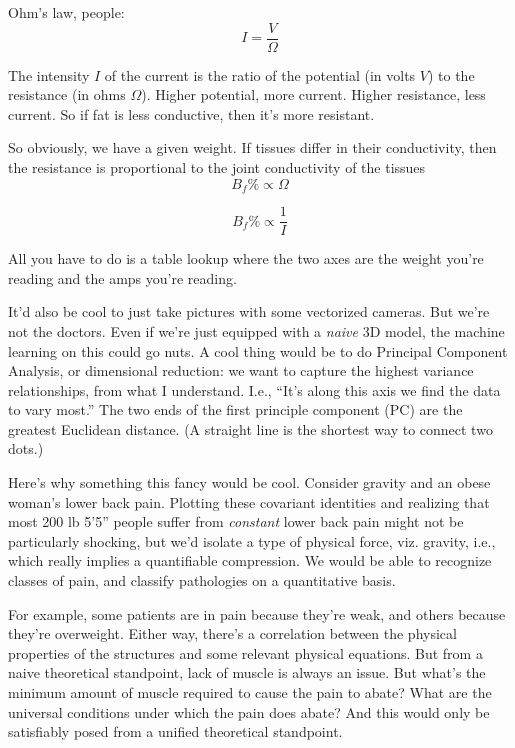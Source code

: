 \documentclass{article}
\begin{document}
Ohm's law, people:
\begin{displaymath}
	I = \frac{V}{\Omega}
\end{displaymath}

The intensity $I$ of the current is the ratio of the potential (in volts $V$) to the resistance (in ohms $\Omega$). Higher potential, more current. Higher resistance, less current. So if fat is less conductive, then it's more resistant.

So obviously, we have a given weight. If tissues differ in their conductivity, then the resistance is proportional to the joint conductivity of the tissues
\begin{displaymath}
	B_f\% \propto \Omega
\end{displaymath}


\begin{displaymath}
	B_f\% \propto \frac{1}{I}
\end{displaymath}

All you have to do is a table lookup where the two axes are the weight you're reading and the amps you're reading.

It'd also be cool to just take pictures with some vectorized cameras. But we're not the doctors. Even if we're just equipped with a \textit{naive} 3D model, the machine learning on this could go nuts. A cool thing would be to do Principal Component Analysis, or dimensional reduction: we want to capture the highest variance relationships, from what I understand. I.e., ``It's along this axis we find the data to vary most.'' The two ends of the first principle component (PC) are the greatest Euclidean distance. (A straight line is the shortest way to connect two dots.) 

Here's why something this fancy would be cool. Consider gravity and an obese woman's lower back pain. Plotting these covariant identities and realizing that most 200 lb 5'5'' people suffer from \textit{constant} lower back pain might not be particularly shocking, but we'd isolate a type of physical force, viz. gravity, i.e., which really implies a quantifiable compression. We would be able to recognize classes of pain, and classify pathologies on a quantitative basis.

For example, some patients are in pain because they're weak, and others because they're overweight. Either way, there's a correlation between the physical properties of the structures and some relevant physical equations. But from a naive theoretical standpoint, lack of muscle is always an issue. But what's the minimum amount of muscle required to cause the pain to abate? What are the universal conditions under which the pain does abate? And this would only be satisfiably posed from a unified theoretical standpoint.
\end{document}
